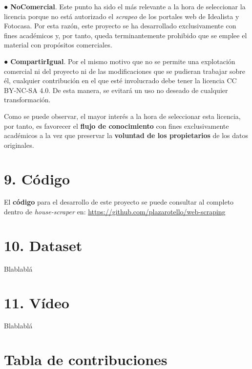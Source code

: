 \documentclass[12pt]{article}
\begin{document}
● \textbf{NoComercial}. Este punto ha sido el más relevante a la hora de seleccionar la licencia porque no está autorizado el \textit{scrapeo} de los portales web de Idealista y Fotocasa. Por esta razón, este proyecto se ha desarrollado exclusivamente con fines académicos y, por tanto, queda terminantemente prohibido que se emplee el material con propósitos comerciales. 

● \textbf{CompartirIgual}. Por el mismo motivo que no se permite una explotación comercial ni del proyecto ni de las modificaciones que se pudieran trabajar sobre él, cualquier contribución en el que esté involucrado debe tener la licencia CC BY-NC-SA 4.0. De esta manera, se evitará un uso no deseado de cualquier transformación.

Como se puede observar, el mayor interés a la hora de seleccionar esta licencia, por tanto, es favorecer el \textbf{flujo de conocimiento} con fines exclusivamente académicos a la vez que preservar la\textbf{ voluntad de los propietarios} de los datos originales. 

\section*{9. Código }\vspace{-1.5em}

El \textbf{código} para el desarrollo de este proyecto se puede consultar al completo dentro de \textit{house-scraper} en: \url{https://github.com/plazarotello/web-scraping}

\section*{10. Dataset }\vspace{-1.5em}

Blablablá

\section*{11. Vídeo }\vspace{-1.5em}

Blablablá

\section*{ Tabla de contribuciones }\vspace{-1.5em}
\end{document}
